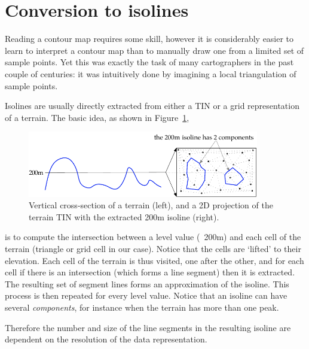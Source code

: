 %
\section{Conversion to isolines}%
\label{sec:iso}

Reading a contour map requires some skill, however it is considerably easier to learn to interpret a contour map than to manually draw one from a limited set of sample points.
Yet this was exactly the task of many cartographers in the past couple of centuries: it was intuitively done by imagining a local triangulation of sample points. 

%

Isolines are usually directly extracted from either a TIN or a grid representation of a terrain. 
The basic idea, as shown in Figure~\ref{fig:isolineidea},
\begin{figure}
  \centering
  \includegraphics[width=0.9\textwidth]{figs/isoline}
  \caption{Vertical cross-section of a terrain (left), and a 2D projection of the terrain TIN with the extracted 200m isoline (right).}%
\label{fig:isolineidea}
\end{figure}
is to compute the intersection between a level value (\eg\ 200m) and each cell of the terrain (triangle or grid cell in our case).
Notice that the cells are `lifted' to their elevation.  
Each cell of the terrain is thus visited, one after the other, and for each cell if there is an intersection (which forms a line segment) then it is extracted.
The resulting set of segment lines forms an approximation of the isoline.
This process is then repeated for every level value.
Notice that an isoline can have several \emph{components}, for instance when the terrain has more than one peak.

Therefore the number and size of the line segments in the resulting isoline are dependent on the resolution of the data representation. 

